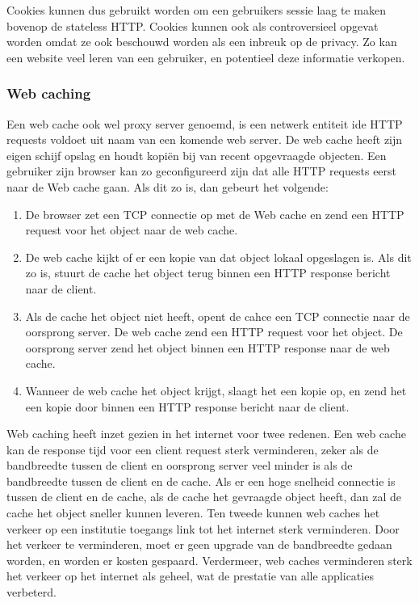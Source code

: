 Cookies kunnen dus gebruikt worden om een gebruikers sessie laag te maken bovenop de stateless HTTP. Cookies kunnen ook als controversieel opgevat worden omdat ze ook beschouwd worden als een inbreuk op de privacy. Zo kan een website veel leren van een gebruiker, en potentieel deze informatie verkopen.

\clearpage

\subsubsection{Web caching}

Een web cache ook wel proxy server genoemd, is een netwerk entiteit ide HTTP requests voldoet uit naam van een komende web server. De web cache heeft zijn eigen schijf opslag en houdt kopiën bij van recent opgevraagde objecten. Een gebruiker zijn browser kan zo geconfigureerd zijn dat alle HTTP requests eerst naar de Web cache gaan. Als dit zo is, dan gebeurt het volgende:
\begin{enumerate}
    \item De browser zet een TCP connectie op met de Web cache en zend een HTTP request voor het object naar de web cache.
\item De web cache kijkt of er een kopie van dat object lokaal opgeslagen is. Als dit zo is, stuurt de cache het object terug binnen een HTTP response bericht naar de client.
\item Als de cache het object niet heeft, opent de cahce een TCP connectie naar de oorsprong server. De web cache zend een HTTP request voor het object. De oorsprong server zend het object binnen een HTTP response naar de web cache.
\item Wanneer de web cache het object krijgt, slaagt het een kopie op, en zend het een kopie door binnen een HTTP response bericht naar de client.
\end{enumerate}
Web caching heeft inzet gezien in het internet voor twee redenen. Een web cache kan de response tijd voor een client request sterk verminderen, zeker als de bandbreedte tussen de client en oorsprong server veel minder is als de bandbreedte tussen de client en de cache. Als er een hoge snelheid connectie is tussen de client en de cache, als de cache het gevraagde object heeft, dan zal de cache het object sneller kunnen leveren.
Ten tweede kunnen web caches het verkeer op een institutie toegangs link tot het internet sterk verminderen. Door het verkeer te verminderen, moet er geen upgrade van de bandbreedte gedaan worden, en worden er kosten gespaard. Verdermeer, web caches verminderen sterk het verkeer op het internet als geheel, wat de prestatie van alle applicaties verbeterd.

